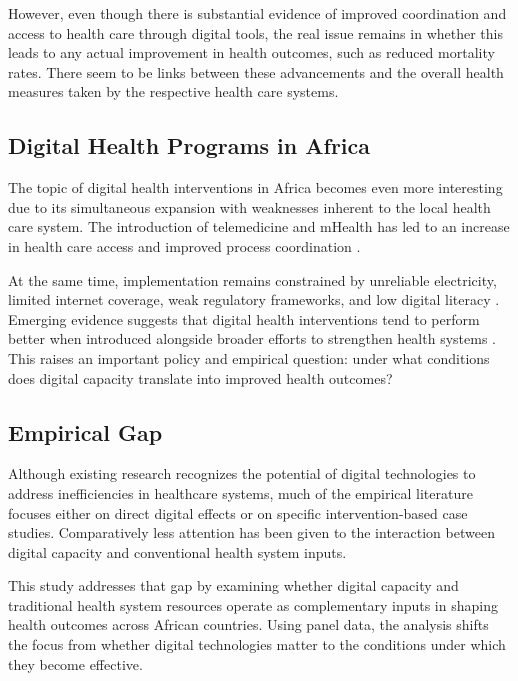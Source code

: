 \documentclass[12pt]{article}
\begin{document}
\medskip
However, even though there is substantial evidence of improved coordination and access to health care through digital tools, the real issue remains in whether this leads to any actual improvement in health outcomes, such as reduced mortality rates. There seem to be links between these advancements and the overall health measures taken by the respective health care systems.

\subsection{Digital Health Programs in Africa}

The topic of digital health interventions in Africa becomes even more interesting due to its simultaneous expansion with weaknesses inherent to the local health care system. The introduction of telemedicine and mHealth has led to an increase in health care access and improved process coordination \citep{omaghomi2024,maita2024}.

\medskip
At the same time, implementation remains constrained by unreliable electricity, limited internet coverage, weak regulatory frameworks, and low digital literacy \citep{mbunge2022}. Emerging evidence suggests that digital health interventions tend to perform better when introduced alongside broader efforts to strengthen health systems \citep{victor2023}. This raises an important policy and empirical question: under what conditions does digital capacity translate into improved health outcomes?

\subsection{Empirical Gap}

Although existing research recognizes the potential of digital technologies to address inefficiencies in healthcare systems, much of the empirical literature focuses either on direct digital effects or on specific intervention-based case studies. Comparatively less attention has been given to the interaction between digital capacity and conventional health system inputs.

\medskip
This study addresses that gap by examining whether digital capacity and traditional health system resources operate as complementary inputs in shaping health outcomes across African countries. Using panel data, the analysis shifts the focus from whether digital technologies matter to the conditions under which they become effective.
\end{document}

